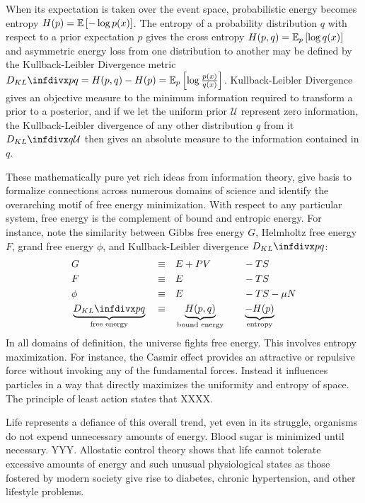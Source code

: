 \documentclass{article}
\begin{document}
When its expectation is taken over the event space, probabilistic energy becomes entropy $H(p) = \expectation{-\log{p(x)}}$. The entropy of a probability distribution $q$ with respect to a prior expectation $p$ gives the cross entropy $H(p,q) = \expectation[p]{ \log{ q(x) } }$ and asymmetric energy loss from one distribution to another may be defined by the Kullback-Leibler Divergence metric $\kld{p}{q} = H(p,q) - H(p) = \expectation[p]{ \log {\frac {p(x)}{q(x)} } }$. Kullback-Leibler Divergence gives an objective measure to the minimum information required to transform a prior to a posterior, and if we let the uniform prior $\mathcal{U}$ represent zero information, the Kullback-Leibler divergence of any other distribution $q$ from it $\kld{q}{\mathcal{U}}$ then gives an absolute measure to the information contained in $q$. 

These mathematically pure yet rich ideas from information theory, give basis to formalize connections across numerous domains of science and identify the overarching motif of free energy minimization. With respect to any particular system, free energy is the complement of bound and entropic energy. For instance, note the similarity between Gibbs free energy $G$, Helmholtz free energy $F$, grand free energy $\phi$, and Kullback-Leibler divergence $\kld{p}{q}$:
\begin{alignat*}{4}
& G    && \equiv && E + PV \quad && - TS \\
& F    && \equiv && E      \quad && - TS \\
& \phi && \equiv && E      \quad && - TS - \mu N \\
& \underbrace{\kld{p}{q}}_{\text{free energy}} && \equiv && \underbrace{H(p,q)}_{\text{bound energy}} \quad && \underbrace{- H(p)}_{\text{entropy}}
\end{alignat*}
In all domains of definition, the universe fights free energy. This involves entropy maximization. For instance, the Casmir effect provides an attractive or repulsive force without invoking any of the fundamental forces. Instead it influences particles in a way that directly maximizes the uniformity and entropy of space. The principle of least action states that XXXX.

Life represents a defiance of this overall trend, yet even in its struggle, organisms do not expend unnecessary amounts of energy. Blood sugar is minimized until necessary. YYY. Allostatic control theory shows that life cannot tolerate excessive amounts of energy and such unusual physiological states as those fostered by modern society give rise to diabetes, chronic hypertension, and other lifestyle problems.
\end{document}
